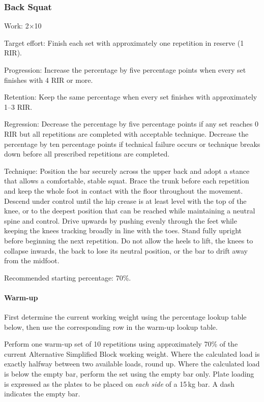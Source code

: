 \documentclass[11pt,a4paper]{article}
\begin{document}
\newpage
\subsubsection{Back Squat}

Work: 2$\times$10

Target effort: Finish each set with approximately one repetition in reserve (1 RIR).

Progression: Increase the percentage by five percentage points when every set finishes with 4 RIR or more.

Retention: Keep the same percentage when every set finishes with approximately 1--3 RIR.

Regression: Decrease the percentage by five percentage points if any set reaches 0 RIR but all repetitions are completed with acceptable technique. Decrease the percentage by ten percentage points if technical failure occurs or technique breaks down before all prescribed repetitions are completed.

Technique: Position the bar securely across the upper back and adopt a stance that allows a comfortable, stable squat. Brace the trunk before each repetition and keep the whole foot in contact with the floor throughout the movement. Descend under control until the hip crease is at least level with the top of the knee, or to the deepest position that can be reached while maintaining a neutral spine and control. Drive upwards by pushing evenly through the feet while keeping the knees tracking broadly in line with the toes. Stand fully upright before beginning the next repetition. Do not allow the heels to lift, the knees to collapse inwards, the back to lose its neutral position, or the bar to drift away from the midfoot.

Recommended starting percentage: 70\%.

\paragraph{Warm-up}

First determine the current working weight using the percentage lookup table below, then use the corresponding row in the warm-up lookup table.

Perform one warm-up set of 10 repetitions using approximately 70\% of the current Alternative Simplified Block working weight. Where the calculated load is exactly halfway between two available loads, round up. Where the calculated load is below the empty bar, perform the set using the empty bar only. Plate loading is expressed as the plates to be placed on \emph{each side} of a 15\,kg bar. A dash indicates the empty bar.
\end{document}
